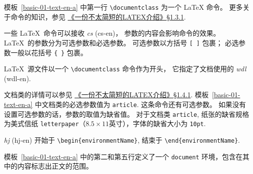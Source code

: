 \documentclass[
    11pt,
    base=hide,
    cite=authoryear,
    device=phone,
    lang=cn,
    mode=simple,
    result=answer,
    toc=onecol,
]{elegantbook_sierxue}
\begin{document}
模板~\ref{basic-01-text-en-a} 中第一行 \lstinline{\documentclass} 为一个
{\LaTeX} 命令。
\noindent 更多关于命令的知识，参见
\hyperlink{books/lshort-zh-cn.pdf.16}%
{《一份不太简短的LATEX介绍》\S1.3.1}.

\begin{latex}\label{tex:arguments}
    一些 \LaTeX\ 命令可以接收 \emph{\gls{cs}} (\gls{cs-en})，
    参数的内容会影响命令的效果。
    \LaTeX\ 的参数分为可选参数和必选参数。
    可选参数以方括号 \texttt{[~]} 包裹；
    必选参数一般以花括号 \texttt{\{~\}} 包裹。
\end{latex}

\begin{latex}\label{tex:documentclass}
    \LaTeX\ 源文件以一个 \lstinline{\documentclass} 命令作为开头，
    它指定了文档使用的 \emph{\gls{wdl}} (\gls{wdl-en}).
\end{latex}

文档类的详情可以参见 \hyperlink{books/lshort-zh-cn.pdf.17}%
{《一份不太简短的LATEX介绍》\S1.4.1}.
模板~\ref{basic-01-text-en-a} 中文档类的必选参数值为 \lstinline{article}.
这条命令还有可选参数。
如果没有设置可选参数的话，参数的取值为缺省值。
对于文档类 \texttt{article}, 纸张的缺省规格为美式信纸
\texttt{letterpaper}（\(8.5\times11\)英寸），字体的缺省大小为 \texttt{10pt}.

\begin{latex}\label{tex:environment}
    \emph{\gls{hj}} (\gls{hj-en}) 开始于
    \lstinline|\begin{environmentName}|,
    结束于 \lstinline|\end{environmentName}|.
\end{latex}
模板~\ref{basic-01-text-en-a} 中的第二和第五行定义了一个 \texttt{document}
环境，包含在其中的内容标志出正文的范围。
\end{document}
